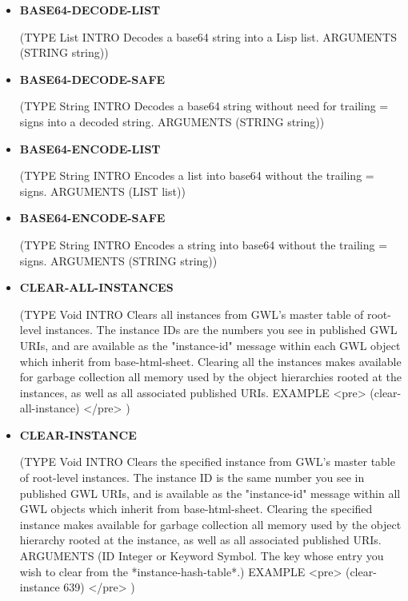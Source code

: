 \documentclass [11pt]{book}
\begin{document}
\begin{itemize}

\item {}
\label{prim:base64-decode-list}
\textbf{BASE64-DECODE-LIST}

(TYPE List INTRO  Decodes a base64 string into a Lisp list.
 ARGUMENTS (STRING string))



\item {}
\label{prim:base64-decode-safe}
\textbf{BASE64-DECODE-SAFE}

(TYPE String INTRO  Decodes a base64 string without need for trailing = signs into a decoded string.
 ARGUMENTS (STRING string))



\item {}
\label{prim:base64-encode-list}
\textbf{BASE64-ENCODE-LIST}

(TYPE String INTRO  Encodes a list into base64 without the trailing = signs.
 ARGUMENTS (LIST list))



\item {}
\label{prim:base64-encode-safe}
\textbf{BASE64-ENCODE-SAFE}

(TYPE String INTRO  Encodes a string into base64 without the trailing = signs.
 ARGUMENTS (STRING string))



\item {}
\label{prim:clear-all-instances}
\textbf{CLEAR-ALL-INSTANCES}

(TYPE Void INTRO  Clears all instances from GWL's master table of root-level instances.
The instance IDs are the numbers you see in published GWL URIs, and are available
as the "instance-id" message within each GWL object which inherit from base-html-sheet.
Clearing all the instances makes available for garbage collection all memory used by
the object hierarchies rooted at the instances, as well as all associated published URIs.
 EXAMPLE <pre> 
  (clear-all-instance)
</pre>
)



\item {}
\label{prim:clear-instance}
\textbf{CLEAR-INSTANCE}

(TYPE Void INTRO  Clears the specified instance from GWL's master table of root-level instances.
The instance ID is the same number you see in published GWL URIs, and is available
as the "instance-id" message within all GWL objects which inherit from base-html-sheet.
Clearing the specified instance makes available for garbage collection all memory used by
the object hierarchy rooted at the instance, as well as all associated published URIs.
 ARGUMENTS (ID Integer or Keyword Symbol. The key whose entry you wish to clear from the *instance-hash-table*.) EXAMPLE <pre> 
  (clear-instance 639)
</pre>
)




\end{itemize}
\end{document}

